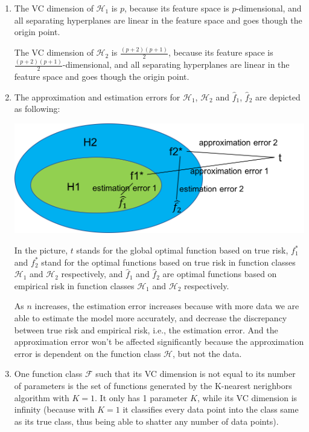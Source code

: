 \documentclass[paper=letter, fontsize=12pt]{article}
\begin{document}
\begin{enumerate}[label=(\alph*)]
	\item 
	The VC dimension of $\mathcal{H}_1$ is $p$, because its feature space is $p$-dimensional, and all separating hyperplanes are linear in the feature space and goes though the origin point.
	
	The VC dimension of $\mathcal{H}_2$ is $\frac{(p+2)(p+1)}{2}$, because its feature space is $\frac{(p+2)(p+1)}{2}$-dimensional, and all separating hyperplanes are linear in the feature space and goes though the origin point.
	
	\item The approximation and estimation errors for $\mathcal{H}_1$, $\mathcal{H}_2$ and $\hat{f}_1$, $\hat{f}_2$ are depicted as following:
	
	\includegraphics[scale=0.6]{q2b.png}
	
	In the picture, $t$ stands for the global optimal function based on true risk, $f_1^*$ and $f_2^*$ stand for the optimal functions based on true risk in function classes $\mathcal{H}_1$ and $\mathcal{H}_2$ respectively, and $\hat{f}_1$ and $\hat{f}_2$ are optimal functions based on empirical risk in function classes $\mathcal{H}_1$ and $\mathcal{H}_2$ respectively.
	
	As $n$ increases, the estimation error increases because with more data we are able to estimate the model more accurately, and decrease the discrepancy between true risk and empirical risk, i.e., the estimation error. And the approximation error won't be affected significantly because the approximation error is dependent on the function class $\mathcal{H}$, but not the data.
	
	\item One function class $\mathcal{F}$ such that its VC dimension is not equal to its number of parameters is the set of functions generated by the K-nearest nerighbors algorithm with $K=1$. It only has 1 parameter $K$, while its VC dimension is infinity (because with $K=1$ it classifies every data point into the class same as its true class, thus being able to shatter any number of data points).
\end{enumerate}
\end{document}
